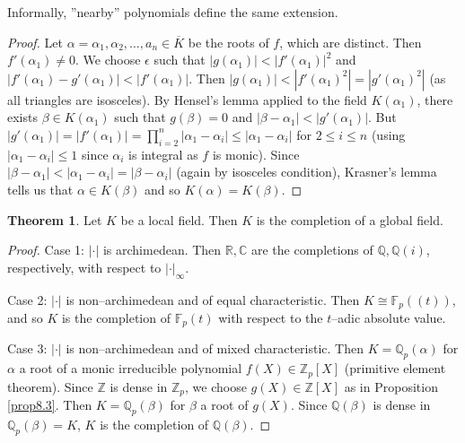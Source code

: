 \documentclass{article}
\theoremstyle{definition}
\newtheorem{theorem}{Theorem}[section]
\begin{document}
Informally, ''nearby'' polynomials define the same extension.
\begin{proof}
    Let $\alpha=\alpha_1,\alpha_2,\ldots,a_n \in \overline{K}$ be the roots of $f$, which are distinct. Then $f'(\alpha_1) \neq 0$. We choose $\epsilon$ such that $|g(\alpha_1)|<|f'(\alpha_1)|^2$ and $|f'(\alpha_1) - g'(\alpha_1)| < |f'(\alpha_1)|$. Then  $|g(\alpha_1)| < |f'(\alpha_1)^2| = |g'(\alpha_1)^2|$ (as all triangles are isosceles). By Hensel's lemma applied to the field $K(\alpha_1)$, there exists $\beta \in K(\alpha_1)$ such that $g(\beta)=0$ and $|\beta-\alpha_1|<|g'(\alpha_1)|$. But $|g'(\alpha_1)| = |f'(\alpha_1)| = \prod_{i=2}^{n} |\alpha_1-\alpha_i| \le |\alpha_1 - \alpha_i|$ for $2\le i\le n$ (using $|\alpha_1-\alpha_i|\le 1$ since $\alpha_i$ is integral as $f$ is monic). Since $|\beta-\alpha_1|<|\alpha_1-\alpha_i| = |\beta-\alpha_i|$ (again by isosceles condition), Krasner's lemma tells us that $\alpha \in K(\beta)$ and so $K(\alpha)=K(\beta)$.
\end{proof}
\begin{theorem}
    Let $K$ be a local field. Then $K$ is the completion of a global field.
\end{theorem}
\begin{proof}
    Case 1: $|\cdot|$ is archimedean. Then $\mathbb{R}, \mathbb{C}$ are the completions of $\mathbb{Q},\mathbb{Q}(i)$, respectively, with respect to $|\cdot|_{\infty}$.
    \vspace{1mm}
     
    Case 2: $|\cdot|$ is non--archimedean and of equal characteristic. Then $K \cong \mathbb{F}_p((t))$, and so $K$ is the completion of $\mathbb{F}_p(t)$ with respect to the $t$--adic absolute value.
    \vspace{1mm}
     
    Case 3: $|\cdot|$ is non--archimedean and of mixed characteristic. Then $K = \mathbb{Q}_p(\alpha)$ for $\alpha$ a root of a monic irreducible polynomial $f(X) \in \mathbb{Z}_p[X]$ (primitive element theorem). Since $\mathbb{Z}$ is dense in $\mathbb{Z}_p$, we choose $g(X) \in \mathbb{Z}[X]$ as in Proposition \ref{prop8.3}. Then $K = \mathbb{Q}_p(\beta)$ for $\beta$ a root of $g(X)$. Since $\mathbb{Q}(\beta)$ is dense in $\mathbb{Q}_p(\beta) =K$, $K$ is the completion of $\mathbb{Q}(\beta)$.
\end{proof}
\end{document}
